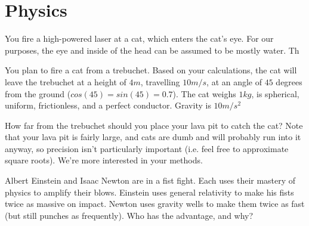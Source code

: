 \documentclass[11pt]{exam}
\begin{document}
\begin{questions}
\begin{parts}
\end{parts}







\newpage
\section{Physics}
\setcounter{question}{0}

\question You fire a high-powered laser at a cat, which enters the cat's
eye. For our purposes, the eye and inside of the head can be assumed to be mostly
water. Th








\newpage
\question[9] You plan to fire a cat from a trebuchet. Based on your calculations, the cat
will leave the trebuchet at a height of $4m$, travelling $10m/s$, at an angle of
$45$ degrees from the ground ($cos(45) = sin(45) = 0.7$). The cat weighs $1kg$,
is spherical, uniform, frictionless, and a perfect conductor. Gravity is $10m/s^2$

How far from the trebuchet should you place your lava pit to catch the cat? Note
that your lava pit is fairly large, and cats are dumb and will probably run into
it anyway, so precision isn't particularly important (i.e. feel free to approximate square
roots). We're more interested in
your methods.







\newpage
\question[3] Albert Einstein and Isaac Newton are in a fist fight. Each uses their
mastery of physics to amplify their blows. Einstein uses general relativity to
make his fists twice as massive on impact. Newton uses gravity wells to make them twice as
fast (but still punches as frequently). Who has the advantage, and why?
\vfill






\end{questions}
\end{document}
